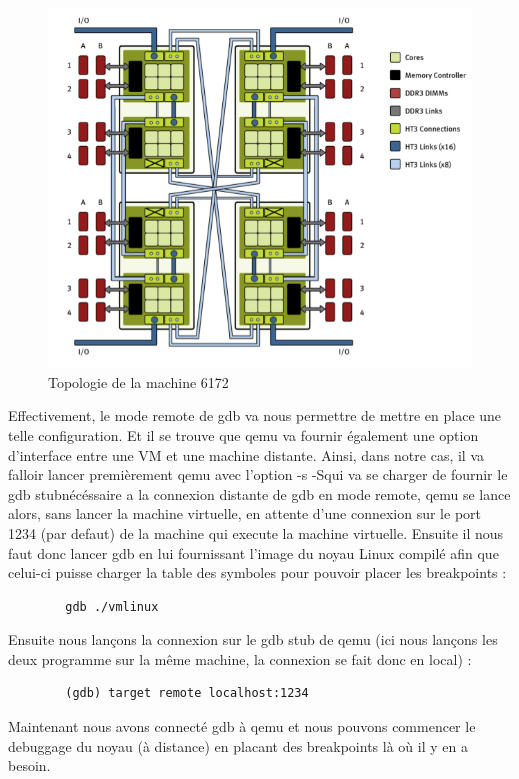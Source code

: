     \begin{figure}[!h]
      \centering
      \includegraphics[scale=0.4]{img/numa_arch_details.png}
      \caption{Topologie de la machine 6172}
      \label{f:numa_topology}
    \end{figure}

        Effectivement, le mode remote de gdb va nous permettre de mettre en place 
        une telle configuration. Et il se trouve que qemu va fournir également 
        une option d'interface entre une VM et une machine distante.
        Ainsi, dans notre cas, il va falloir lancer premièrement qemu avec l'option
        \og -s -S\fg qui va se charger de fournir le \og gdb stub\fg nécéssaire a la 
        connexion distante de gdb en mode remote, qemu se lance alors, sans lancer 
        la machine virtuelle, en attente d'une connexion sur le port 1234 
        (par defaut) de la machine qui execute la machine virtuelle.
        Ensuite il nous faut donc lancer gdb en lui fournissant l'image du noyau 
        Linux compilé afin que celui-ci puisse charger la table des symboles 
        pour pouvoir placer les breakpoints :
        \begin{lstlisting}
        gdb ./vmlinux
        \end{lstlisting}
        Ensuite nous lançons la connexion sur le gdb stub de qemu (ici nous lançons 
        les deux programme sur la même machine, la connexion se fait donc en local) :
        \begin{lstlisting}
        (gdb) target remote localhost:1234
        \end{lstlisting}
        Maintenant nous avons connecté gdb à qemu et nous pouvons commencer le 
        debuggage du noyau (à distance) en placant des breakpoints là où il y en a
        besoin.


